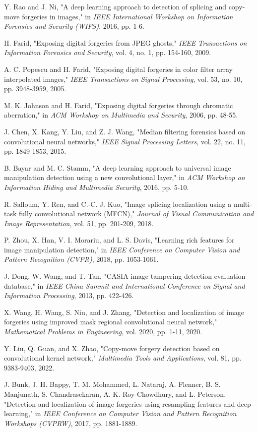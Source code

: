 \documentclass[conference]{IEEEtran}
\begin{document}
\begin{thebibliography}{00}
 Y. Rao and J. Ni, "A deep learning approach to detection of splicing and copy-move forgeries in images," in \textit{IEEE International Workshop on Information Forensics and Security (WIFS)}, 2016, pp. 1-6.

 H. Farid, "Exposing digital forgeries from JPEG ghosts," \textit{IEEE Transactions on Information Forensics and Security}, vol. 4, no. 1, pp. 154-160, 2009.

 A. C. Popescu and H. Farid, "Exposing digital forgeries in color filter array interpolated images," \textit{IEEE Transactions on Signal Processing}, vol. 53, no. 10, pp. 3948-3959, 2005.

 M. K. Johnson and H. Farid, "Exposing digital forgeries through chromatic aberration," in \textit{ACM Workshop on Multimedia and Security}, 2006, pp. 48-55.

 J. Chen, X. Kang, Y. Liu, and Z. J. Wang, "Median filtering forensics based on convolutional neural networks," \textit{IEEE Signal Processing Letters}, vol. 22, no. 11, pp. 1849-1853, 2015.

 B. Bayar and M. C. Stamm, "A deep learning approach to universal image manipulation detection using a new convolutional layer," in \textit{ACM Workshop on Information Hiding and Multimedia Security}, 2016, pp. 5-10.

 R. Salloum, Y. Ren, and C.-C. J. Kuo, "Image splicing localization using a multi-task fully convolutional network (MFCN)," \textit{Journal of Visual Communication and Image Representation}, vol. 51, pp. 201-209, 2018.

 P. Zhou, X. Han, V. I. Morariu, and L. S. Davis, "Learning rich features for image manipulation detection," in \textit{IEEE Conference on Computer Vision and Pattern Recognition (CVPR)}, 2018, pp. 1053-1061.

 J. Dong, W. Wang, and T. Tan, "CASIA image tampering detection evaluation database," in \textit{IEEE China Summit and International Conference on Signal and Information Processing}, 2013, pp. 422-426.

 X. Wang, H. Wang, S. Niu, and J. Zhang, "Detection and localization of image forgeries using improved mask regional convolutional neural network," \textit{Mathematical Problems in Engineering}, vol. 2020, pp. 1-11, 2020.

 Y. Liu, Q. Guan, and X. Zhao, "Copy-move forgery detection based on convolutional kernel network," \textit{Multimedia Tools and Applications}, vol. 81, pp. 9383-9403, 2022.

 J. Bunk, J. H. Bappy, T. M. Mohammed, L. Nataraj, A. Flenner, B. S. Manjunath, S. Chandrasekaran, A. K. Roy-Chowdhury, and L. Peterson, "Detection and localization of image forgeries using resampling features and deep learning," in \textit{IEEE Conference on Computer Vision and Pattern Recognition Workshops (CVPRW)}, 2017, pp. 1881-1889.
\end{thebibliography}
\end{document}
